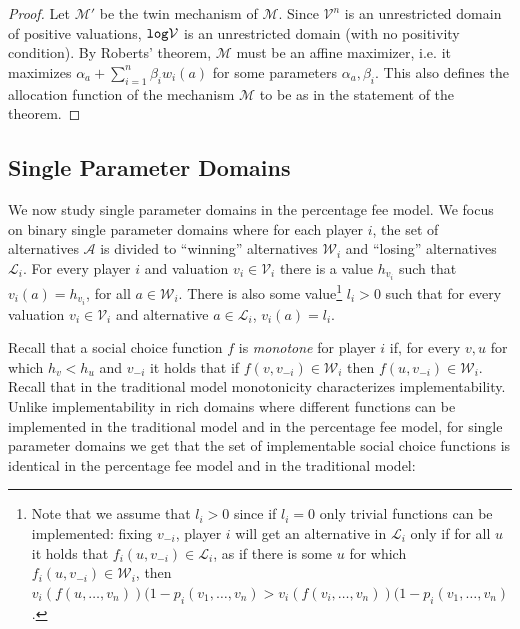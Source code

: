 \documentclass{theoretics}
\newcommand{\cM}{{\mathcal M}}
\newcommand{\cV}{{\mathcal V}}
\begin{document}
\begin{proof}
Let $\cM'$ be the twin mechanism of $\cM$.  Since $\cV^n$ is an unrestricted domain of positive valuations, ${\tt log }\cV$ is an unrestricted domain (with no positivity condition). By Roberts' theorem, $\cM$ must be an affine maximizer, i.e. it maximizes $\alpha_a + \sum_{i=1}^{n} \beta_i w_i(a)$ for some parameters $\alpha_a, \beta_i$. This also defines the allocation function of the mechanism $\cM$ to be as in the statement of the theorem.
\end{proof}


\subsection{Single Parameter Domains}\label{subsec-single-parameter}

We now study single parameter domains in the percentage fee model. We focus on binary single parameter domains where for each player $i$, the set of alternatives $\mathcal A$ is divided to ``winning'' alternatives $\mathcal W_i$ and ``losing'' alternatives $\mathcal L_i$. For every player $i$ and valuation $v_i\in \mathcal V_i$ there is a value $h_{v_i}$ such that $v_i(a)=h_{v_i}$, for all $a\in \mathcal W_i$. There is also some value\footnote{Note that we assume that $l_i>0$ since if $l_i=0$ only trivial functions can be implemented: fixing $v_{-i}$, player $i$ will get an alternative in $\mathcal L_i$ only if for all $u$ it holds that $f_i(u,v_{-i})\in \mathcal L_i$, as if there is some $u$ for which $f_i(u,v_{-i})\in \mathcal W_i$, then $v_i(f(u,\ldots, v_n))(1-p_i(v_1,\ldots,v_n)>v_i(f(v_i,\ldots, v_n))(1-p_i(v_1,\ldots,v_n)$.} $l_i>0$ such that for every valuation $v_i\in \mathcal V_i$ and alternative $a\in \mathcal L_i$, $v_i(a)=l_i$.

Recall that a social choice function $f$ is \emph{monotone} for player $i$ if, for every $v,u$ for which $h_v<h_u$ and $v_{-i}$ it holds that if $f(v,v_{-i})\in \mathcal W_i$ then $f(u,v_{-i})\in \mathcal W_i$. Recall that in the traditional model monotonicity characterizes implementability. Unlike implementability in rich domains where different functions can be implemented in the traditional model and in the percentage fee model, for single parameter domains we get that the set of implementable social choice functions is identical in the percentage fee model and in the traditional model:
\end{document}
